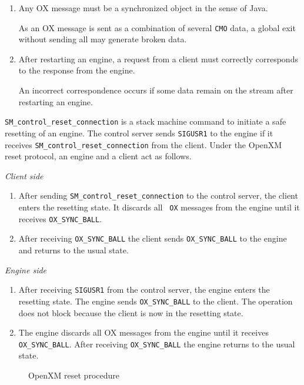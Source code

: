 \begin{enumerate}
\item Any OX message must be a synchronized object in the sense of Java.

As an OX message is sent as a combination of several {\tt CMO}
data, a global exit without sending all may generate broken data.

\item After restarting an engine, a request from a client 
must correctly corresponds to the response from the engine.

An incorrect correspondence occurs if some data remain on the stream
after restarting an engine.
\end{enumerate}

{\tt SM\_control\_reset\_connection} is a stack machine command to
initiate a safe resetting of an engine.
The control server sends {\tt SIGUSR1} to the engine if it receives
{\tt SM\_control\_reset\_connection} from the client.
Under the OpenXM reset protocol, an engine and a client act as follows.

\vskip 2mm
\noindent
{\it Client side} 
\begin{enumerate}
\item After sending {\tt SM\_control\_reset\_connection} to the
control server, the client enters the resetting state. It discards all {\tt
OX} messages from the engine until it receives {\tt OX\_SYNC\_BALL}.
\item After receiving {\tt OX\_SYNC\_BALL} the client sends 
{\tt OX\_SYNC\_BALL} to the engine and returns to the usual state.
\end{enumerate}

\noindent
{\it Engine side}
\begin{enumerate}
\item 
After receiving {\tt SIGUSR1} from the control server,
the engine enters the resetting state.
The engine sends {\tt OX\_SYNC\_BALL} to the client.
The operation does not block because
the client is now in the resetting state.
\item The engine discards all OX messages from the engine until it
receives {\tt OX\_SYNC\_BALL}. After receiving {\tt OX\_SYNC\_BALL} 
the engine returns to the usual state.
\end{enumerate}

\begin{figure}[htbp]
\epsfxsize=8.5cm
\caption{OpenXM reset procedure}
\label{reset}
\end{figure}

